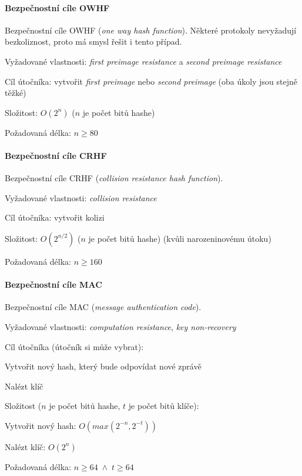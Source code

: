 \paragraph*{Bezpečnostní cíle OWHF} Bezpečnostní cíle OWHF (\textit{one way hash function}). Některé protokoly nevyžadují bezkoliznost, proto má smysl řešit i tento případ. \begin{compactitem}
    \item Vyžadované vlastnosti: \textit{first preimage resistance} a \textit{second preimage resistance}
    \item Cíl útočníka: vytvořit \textit{first preimage} nebo \textit{second preimage} (oba úkoly jsou stejně těžké)
    \item Složitost: $O(2^n)$ ($n$ je počet bitů hashe)
    \item Požadovaná délka: $n \geq 80$
\end{compactitem}

\paragraph*{Bezpečnostní cíle CRHF} Bezpečnostní cíle CRHF (\textit{collision resistance hash function}). \begin{compactitem}
    \item Vyžadované vlastnosti: \textit{collision resistance}
    \item Cíl útočníka: vytvořit kolizi
    \item Složitost: $O(2^{n / 2})$ ($n$ je počet bitů hashe) (kvůli narozeninovému útoku)
    \item Požadovaná délka: $n \geq 160$
\end{compactitem}

\paragraph*{Bezpečnostní cíle MAC} Bezpečnostní cíle MAC (\textit{message authentication code}). \begin{compactitem}
    \item Vyžadované vlastnosti: \textit{computation resistance}, \textit{key non-recovery}
    \item Cíl útočníka (útočník si může vybrat): \begin{compactitem}
        \item Vytvořit nový hash, který bude odpovídat nové zprávě
        \item Nalézt klíč
    \end{compactitem}
    \item Složitost ($n$ je počet bitů hashe, $t$ je počet bitů klíče): \begin{compactitem}
        \item Vytvořit nový hash: $O(max(2^{-n}, 2^{-t}))$
        \item Nalézt klíč: $O(2^n)$
    \end{compactitem}
    \item Požadovaná délka: $n \geq 64 \; \land \; t \geq 64$
\end{compactitem}

